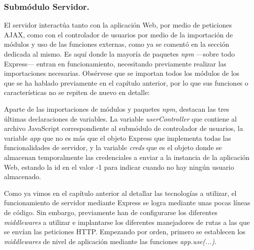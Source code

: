 \subsubsection{Submódulo Servidor.} \label{serverSubmodule}

El servidor interactúa tanto con la aplicación Web, por medio de peticiones AJAX, como con el controlador de usuarios por medio de la importación de módulos y uso de las funciones externas, como ya se comentó en la sección dedicada al mismo. Es aquí donde la mayoría de paquetes \emph{npm} —sobre todo Express— entran en funcionamiento, necesitando previamente realizar las importaciones necesarias. Obsérvese que se importan todos los módulos de los que se ha hablado previamente en el capítulo anterior, por lo que sus funciones o características no se repiten de nuevo en detalle:


Aparte de las importaciones de módulos y paquetes \emph{npm}, destacan las tres últimas declaraciones de variables. La variable \emph{userController} que contiene al archivo JavaScript correspondiente al submódulo de controlador de usuarios, la variable \emph{app} que no es más que el objeto Express que implementa todas las funcionalidades de servidor, y la variable \emph{creds} que es el objeto donde se almacenan temporalmente las credenciales a enviar a la instancia de la aplicación Web, estando la id en el valor -1 para indicar cuando no hay ningún usuario almacenado.

Como ya vimos en el capítulo anterior al detallar las tecnologías a utilizar, el funcionamiento de servidor mediante Express se logra mediante unas pocas líneas de código. Sin embargo, previamente han de configurarse los diferentes \emph{middlewares} a utilizar e implantarse los diferentes manejadores de rutas a las que se envían las peticiones HTTP. Empezando por orden, primero se establecen los \emph{middlewares} de nivel de aplicación mediante las funciones \emph{app.use(...)}.


